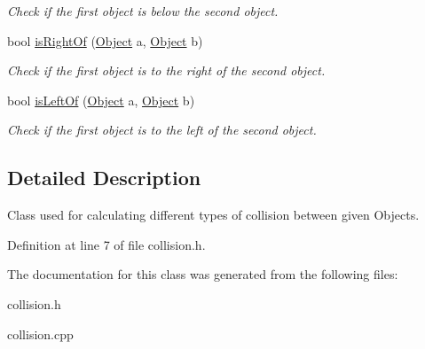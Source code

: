 \begin{DoxyCompactItemize}
\begin{DoxyCompactList}\small\item\em Check if the first object is below the second object. \end{DoxyCompactList}\item 
bool \hyperlink{classCollision_a9330290516beca87905e81a974ffca83}{is\+Right\+Of} (\hyperlink{classObject}{Object} a, \hyperlink{classObject}{Object} b)\hypertarget{classCollision_a9330290516beca87905e81a974ffca83}{}\label{classCollision_a9330290516beca87905e81a974ffca83}

\begin{DoxyCompactList}\small\item\em Check if the first object is to the right of the second object. \end{DoxyCompactList}\item 
bool \hyperlink{classCollision_aea67f8b0cd9b37408e2f6f65006b27d3}{is\+Left\+Of} (\hyperlink{classObject}{Object} a, \hyperlink{classObject}{Object} b)\hypertarget{classCollision_aea67f8b0cd9b37408e2f6f65006b27d3}{}\label{classCollision_aea67f8b0cd9b37408e2f6f65006b27d3}

\begin{DoxyCompactList}\small\item\em Check if the first object is to the left of the second object. \end{DoxyCompactList}\end{DoxyCompactItemize}


\subsection{Detailed Description}
Class used for calculating different types of collision between given Objects. 

Definition at line 7 of file collision.\+h.



The documentation for this class was generated from the following files\+:\begin{DoxyCompactItemize}
\item 
collision.\+h\item 
collision.\+cpp\end{DoxyCompactItemize}
